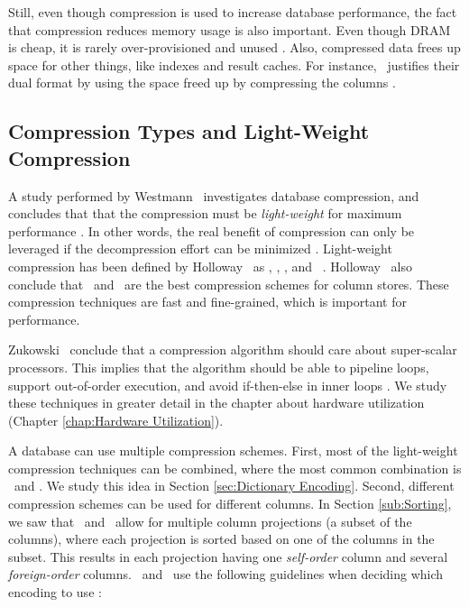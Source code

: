 Still, even though compression is used to increase database performance, the fact that compression reduces memory usage is also important. Even though DRAM is cheap, it is rarely over-provisioned and unused \cite{Barber2014-ey}. Also, compressed data frees up space for other things, like indexes and result caches. For instance, \oracle~justifies their dual format by using the space freed up by compressing the columns \cite{Lahiri2015-mz, Lamb2012-kg}.

\subsection{Compression Types and Light-Weight Compression}
\label{sub:Compression Types and Light-Weight Compression}
A study performed by Westmann \ea~investigates database compression, and concludes that that the compression must be \textit{light-weight} for maximum performance \cite{Westmann2000-mz}. In other words, the real benefit of compression can only be leveraged if the decompression effort can be minimized \cite{Lemke2010-is}. Light-weight compression has been defined by Holloway \ea~as \bp, \de, \dele, and \rle~\cite{Holloway2008-rr}. Holloway \ea~also conclude that \de~and \rle~are the best compression schemes for column stores. These compression techniques are fast and fine-grained, which is important for performance.

Zukowski \ea~conclude that a compression algorithm should care about super-scalar processors. This implies that the algorithm should be able to pipeline loops, support out-of-order execution, and avoid if-then-else in inner loops \cite{Zukowski2006-oz}. We study these techniques in greater detail in the chapter about hardware utilization (Chapter \ref{chap:Hardware Utilization}). 

A database can use multiple compression schemes. First, most of the light-weight compression techniques can be combined, where the most common combination is \de~and \bp. We study this idea in Section \ref{sec:Dictionary Encoding}. Second, different compression schemes can be used for different columns. In Section \ref{sub:Sorting}, we saw that \cstore~and \vertica~allow for multiple column projections (a subset of the columns), where each projection is sorted based on one of the columns in the subset. This results in each projection having one \textit{self-order} column and several \textit{foreign-order} columns.  \cstore~and \vertica~use the following guidelines when deciding which encoding to use \cite{Stonebraker2005-qz}: 

